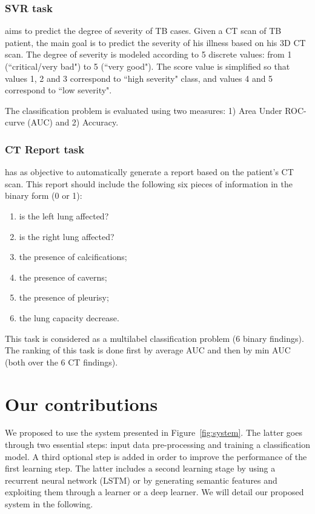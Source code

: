 \documentclass{llncs}
\begin{document}
\subsubsection{SVR task}
aims to predict the degree of severity of TB cases. Given a CT scan of TB patient, the main goal is to predict the severity of his illness based on his 3D CT scan. The degree of severity is modeled according to 5 discrete values: from 1 (``critical/very bad") to 5 (``very good"). The score value is simplified so that values 1, 2 and 3 correspond to ``high severity" class, and values 4 and 5 correspond to ``low severity".

The classification problem is evaluated using two measures: 1) Area Under ROC-curve (AUC) and 2) Accuracy. 

\subsubsection{CT Report task} has as objective to automatically generate a report based on the patient's CT scan. This report should include the following six pieces of information in the binary form (0 or 1):
\begin{enumerate}
 \item is the left lung affected?
 \item is the right lung affected? 
\item the presence of calcifications;
 \item the presence of caverns;
  \item the presence of pleurisy;
 \item the lung capacity decrease.
\end{enumerate}

This task is considered as a multilabel classification problem (6 binary findings). The ranking of this task is done first by average AUC and then by min AUC (both over the 6 CT findings).

\section{Our contributions}
\label{contribution}
We proposed to use the system presented in Figure~\ref{fig:system}. The latter goes through two essential steps: input data pre-processing and training a classification model. A third optional step is added in order to improve the performance of the first learning step. The latter includes a second learning stage by using a recurrent neural network (LSTM) or by generating semantic features and exploiting them through a learner or a deep learner. We will detail our proposed system in the following.
\end{document}

